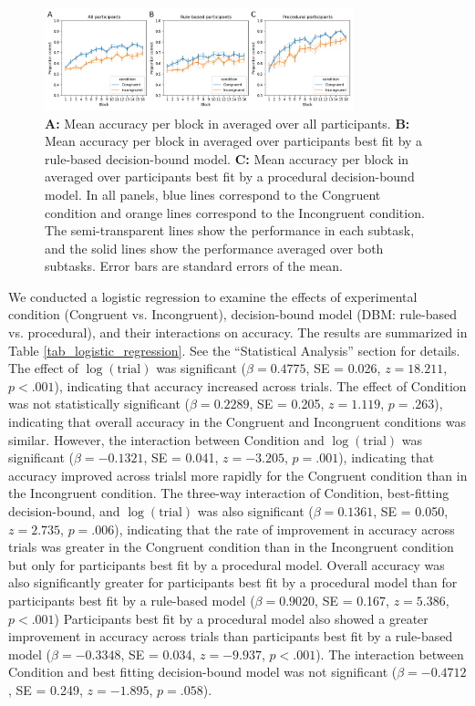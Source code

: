 \documentclass[doc, floatsintext]{apa7}
\begin{document}
\begin{figure}[h!]
    \centering
    \includegraphics[width=0.8\textwidth]{../figures/fig_accuracy_per_block_by_model.png}
    \caption{
        \textbf{A:} Mean accuracy per block in averaged over
        all participants. \textbf{B:} Mean accuracy per block
        in averaged over participants best fit by a
        rule-based decision-bound model.  \textbf{C:} Mean
        accuracy per block in averaged over participants
        best fit by a procedural decision-bound model.
        In all panels, blue lines correspond to the
        Congruent condition and orange lines correspond to
        the Incongruent condition.  The semi-transparent
        lines show the performance in each subtask, and the
        solid lines show the performance averaged over both
        subtasks. Error bars are standard errors of the
        mean.
    }
    \label{fig_learning_curves}
\end{figure}

We conducted a logistic regression to examine the effects of
experimental condition (Congruent vs.  Incongruent),
decision-bound model (DBM: rule-based vs.  procedural), and
their interactions on accuracy.  The results are summarized
in Table \ref{tab_logistic_regression}.  See the
``Statistical Analysis'' section for details. 
%
The effect of $\log(\text{trial})$ was significant ($\beta =
0.4775$, SE = 0.026, $z = 18.211$, $p < .001$), indicating
that accuracy increased across trials.  
%
The effect of Condition was not statistically significant
($\beta = 0.2289$, SE = 0.205, $z = 1.119$, $p = .263$),
indicating that overall accuracy in the Congruent and
Incongruent conditions was similar. 
%
However, the interaction between Condition and
$\log(\text{trial})$ was significant ($\beta = -0.1321$, SE
= 0.041, $z = -3.205$, $p = .001$), indicating that accuracy
improved across trialsl more rapidly for the Congruent
condition than in the Incongruent condition.
%
The three-way interaction of Condition, best-fitting
decision-bound, and $\log(\text{trial})$ was also
significant ($\beta = 0.1361$, SE = 0.050, $z = 2.735$, $p =
.006$), indicating that the rate of improvement in accuracy
across trials was greater in the Congruent condition than in
the Incongruent condition but only for participants best fit
by a procedural model.
%
Overall accuracy was also significantly greater for
participants best fit by a procedural model than for
participants best fit by a rule-based model ($\beta =
0.9020$, SE = 0.167, $z = 5.386$, $p < .001$)
%
Participants best fit by a procedural model also showed a
greater improvement in accuracy across trials than
participants best fit by a rule-based model ($\beta =
-0.3348$, SE = 0.034, $z = -9.937$, $p < .001$).
%
The interaction between Condition and best fitting
decision-bound model was not significant ($\beta = -0.4712$,
SE = 0.249, $z = -1.895$, $p = .058$).
\end{document}
